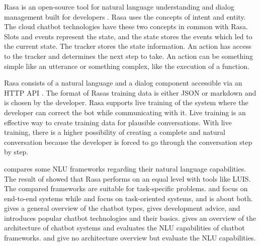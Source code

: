 Rasa is an open-source tool for natural language understanding and dialog management built for developers \cite{rasabocklisch2017}.
Rasa uses the concepts of intent and entity. 
The cloud chatbot technologies have these two concepts in common with Rasa.
Slots and events represent the state, and the state stores the events which led to the current state. 
The tracker stores the state information.
An action has access to the tracker and determines the next step to take. 
An action can be something simple like an utterance or something complex, like the execution of a function.

Rasa consists of a natural language and a dialog component accessible via an HTTP API \cite{rasabocklisch2017}.
The format of Rasas training data is either JSON or markdown and is chosen by the developer.
Rasa supports live training of the system where the developer can correct the bot while communicating with it.
Live training is an effective way to create training data for plausible conversations.
With live training, there is a higher possibility of creating a complete and natural conversation because the developer is forced to go through the conversation step by step.


\citet{braunEvaluatingNLU} compares some NLU frameworks regarding their natural language capabilities.
The result of \citet{braunEvaluatingNLU} showed that Rasa performs on an equal level with tools like LUIS.
The compared frameworks are suitable for task-specific problems.
\citet{evaluateChatbotsShawar2007,bordes2016learning} and \citet{williams2017hybrid} focus on end-to-end systems while \citet{braunEvaluatingNLU, dutta2017developing,luis2015williams,rasabocklisch2017,pharmacybot} and \citet{gregori2017evaluation} focus on task-oriented systems, and \citet{singhbuilding} is about both.
\citet{singhbuilding} gives a general overview of the chatbot types, gives development advice, and introduces popular chatbot technologies and their basics.
\citet{braunEvaluatingNLU} gives an overview of the architecture of chatbot systems and evaluates the NLU capabilities of chatbot frameworks.
\citet{gregori2017evaluation} and \citet{dutta2017developing} give no architecture overview but evaluate the NLU capabilities.

